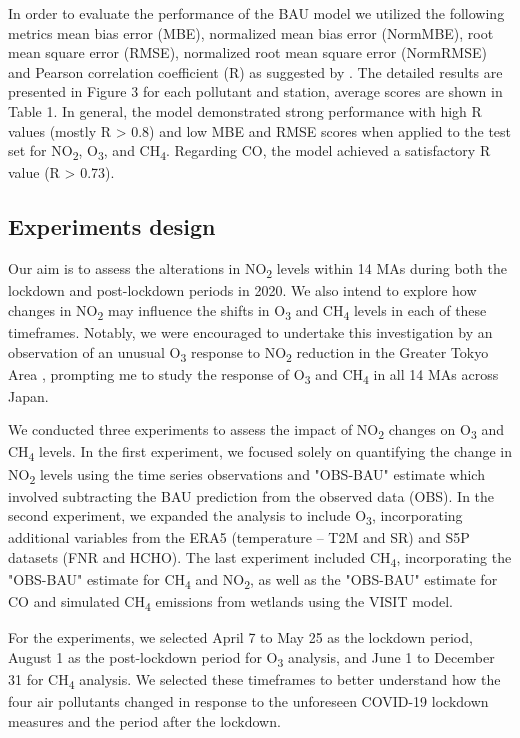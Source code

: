 In order to evaluate the performance of the BAU model we utilized the following metrics mean bias error (MBE), normalized mean bias error (NormMBE), root mean square error (RMSE), normalized root mean square error (NormRMSE) and Pearson correlation coefficient (R) as suggested by \citep{grange2021covid}. The detailed results are presented in Figure 3 for each pollutant and station, average scores are shown in Table 1. In general, the model demonstrated strong performance with high R values (mostly R > 0.8) and low MBE and RMSE scores when applied to the test set for NO\textsubscript{2}, O\textsubscript{3}, and CH\textsubscript{4}. Regarding CO, the model achieved a satisfactory R value (R > 0.73).\par

\subsection{Experiments design}
Our aim is to assess the alterations in NO\textsubscript{2} levels within 14 MAs during both the lockdown and post-lockdown periods in 2020. We also intend to explore how changes in NO\textsubscript{2} may influence the shifts in O\textsubscript{3} and CH\textsubscript{4} levels in each of these timeframes. Notably, we were encouraged to undertake this investigation by an observation of an unusual O\textsubscript{3} response to NO\textsubscript{2} reduction in the Greater Tokyo Area \citep{damiani2022peculiar}, prompting me to study the response of O\textsubscript{3} and CH\textsubscript{4} in all 14 MAs across Japan. \par
We conducted three experiments to assess the impact of NO\textsubscript{2} changes on O\textsubscript{3} and CH\textsubscript{4} levels. In the first experiment, we focused solely on quantifying the change in NO\textsubscript{2} levels using the time series observations and "OBS-BAU" estimate which involved subtracting the BAU prediction from the observed data (OBS). In the second experiment, we expanded the analysis to include O\textsubscript{3}, incorporating additional variables  from the ERA5 (temperature – T2M and SR) and S5P datasets (FNR and HCHO). The last experiment included CH\textsubscript{4}, incorporating the "OBS-BAU" estimate for CH\textsubscript{4} and NO\textsubscript{2}, as well as the "OBS-BAU" estimate for CO and simulated CH\textsubscript{4} emissions from wetlands using the VISIT model. \par
For the experiments, we selected April 7 to May 25 as the lockdown period, August 1 as the post-lockdown period for O\textsubscript{3} analysis, and June 1 to December 31 for CH\textsubscript{4} analysis. We selected these timeframes to better understand how the four air pollutants changed in response to the unforeseen COVID-19 lockdown measures and the period after the lockdown. \par

